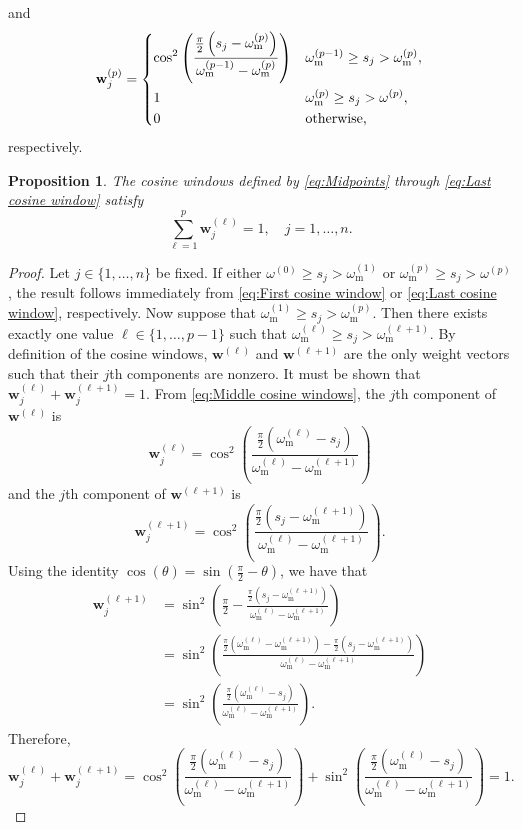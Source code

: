 \documentclass[12pt]{article}
\newcommand{\wVec}{\mathbf{w}}	%
\newcommand{\partition}{\omega}  %
\newcommand{\midpoint}{\partition_{\text{m}}}   %
\newcommand{\singular}{s}	%
\newtheorem{proposition}{Proposition}[section]
\begin{document}
and
\begin{equation}
\label{eq:Last cosine window}
    \wVec_j^{(p)} = \begin{dcases}
    \cos^2\left(\frac{\frac{\pi}{2}\left(\singular_j - \midpoint^{(p)}\right)}{\midpoint^{(p-1)} - \midpoint^{(p)}}\right) & \midpoint^{(p-1)} \geq \singular_j > \midpoint^{(p)}, \\
    1 & \midpoint^{(p)} \geq \singular_j > \omega^{(p)}, \\
    0 & \text{otherwise,}
    \end{dcases}
\end{equation}
respectively.
\begin{proposition}
\label{prop:Cosine windows}
The cosine windows defined by \eqref{eq:Midpoints} through \eqref{eq:Last cosine window} satisfy
\[\sum_{\ell=1}^{p} \wVec_j^{(\ell)} = 1, \quad j = 1,\ldots,n.\]
\end{proposition}
\begin{proof}
Let $j \in \{1,\ldots,n\}$ be fixed. If either $\omega^{(0)} \geq \singular_j > \midpoint^{(1)}$ or $\midpoint^{(p)} \geq \singular_j > \omega^{(p)}$, the result follows immediately from \eqref{eq:First cosine window} or \eqref{eq:Last cosine window}, respectively. Now suppose that $\midpoint^{(1)} \geq \singular_j > \midpoint^{(p)}$. Then there exists exactly one value $\ell \in \{1,\ldots,p-1\}$ such that $\midpoint^{(\ell)} \geq \singular_j > \midpoint^{(\ell+1)}$. By definition of the cosine windows, $\wVec^{(\ell)}$ and $\wVec^{(\ell+1)}$ are the only weight vectors such that their $j$th components are nonzero. It must be shown that $\wVec^{(\ell)}_j + \wVec^{(\ell+1)}_j = 1$. From \eqref{eq:Middle cosine windows}, the $j$th component of $\wVec^{(\ell)}$ is
\[\wVec^{(\ell)}_j = \cos^2\left(\frac{\frac{\pi}{2}\left(\midpoint^{(\ell)} - \singular_j\right)}{\midpoint^{(\ell)} - \midpoint^{(\ell+1)}}\right)\]
and the $j$th component of $\wVec^{(\ell+1)}$ is
\[\wVec^{(\ell+1)}_j =  \cos^2\left(\frac{\frac{\pi}{2}\left(\singular_j - \midpoint^{(\ell+1)}\right)}{\midpoint^{(\ell)} - \midpoint^{(\ell+1)}}\right).\]
Using the identity $\cos(\theta) = \sin\left(\frac{\pi}{2} - \theta\right)$, we have that
\begin{align*}
\wVec^{(\ell+1)}_j &= \sin^2\left(\frac{\pi}{2} - \frac{\frac{\pi}{2}\left(\singular_j - \midpoint^{(\ell+1)}\right)}{\midpoint^{(\ell)} - \midpoint^{(\ell+1)}}\right) \\
&= \sin^2\left(\frac{\frac{\pi}{2}\left(\midpoint^{(\ell)} - \midpoint^{(\ell+1)}\right) - \frac{\pi}{2}\left(\singular_j - \midpoint^{(\ell+1)}\right)}{\midpoint^{(\ell)} - \midpoint^{(\ell+1)}}\right) \\
&= \sin^2\left(\frac{\frac{\pi}{2}\left(\midpoint^{(\ell)} - \singular_j\right)}{\midpoint^{(\ell)} - \midpoint^{(\ell+1)}}\right).
\end{align*}
Therefore,
\[\wVec^{(\ell)}_j + \wVec^{(\ell+1)}_j = \cos^2\left(\frac{\frac{\pi}{2}\left(\midpoint^{(\ell)} - \singular_j\right)}{\midpoint^{(\ell)} - \midpoint^{(\ell+1)}}\right) +  \sin^2\left(\frac{\frac{\pi}{2}\left(\midpoint^{(\ell)} - \singular_j\right)}{\midpoint^{(\ell)} - \midpoint^{(\ell+1)}}\right) = 1.\]
\end{proof}
\end{document}
